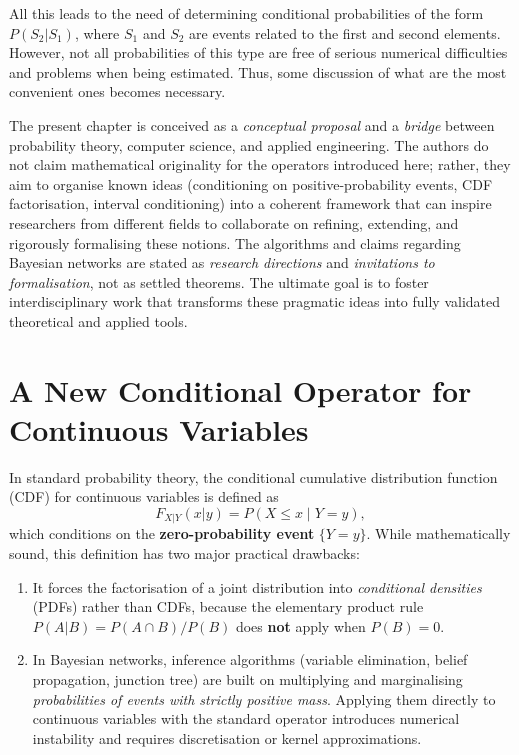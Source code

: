 All this leads to the need of determining conditional probabilities of the form $P(S_2|S_1)$, where $S_1$ and $S_2$ are events related to the first and second elements. However, not all probabilities of this type are free of serious numerical difficulties and problems when being estimated. Thus, some discussion of what are the most convenient ones becomes necessary.

\begin{remarkbox}
\begin{remarkT}
The present chapter is conceived as a \emph{conceptual proposal} and a \emph{bridge} between probability theory, computer science, and applied engineering. The authors do not claim mathematical originality for the operators introduced here; rather, they aim to organise known ideas (conditioning on positive-probability events, CDF factorisation, interval conditioning) into a coherent framework that can inspire researchers from different fields to collaborate on refining, extending, and rigorously formalising these notions. The algorithms and claims regarding Bayesian networks are stated as \emph{research directions} and \emph{invitations to formalisation}, not as settled theorems. The ultimate goal is to foster interdisciplinary work that transforms these pragmatic ideas into fully validated theoretical and applied tools.
\end{remarkT}
\end{remarkbox}

\section{A New Conditional Operator for Continuous Variables}
\label{sec:positive-probability-conditional}

In standard probability theory, the conditional cumulative distribution function (CDF) for continuous variables is defined as
\[
F_{X|Y}(x|y) = P(X \le x \mid Y = y),
\]
which conditions on the \textbf{zero-probability event} $\{Y=y\}$. While mathematically sound, this definition has two major practical drawbacks:
\begin{enumerate}
    \item It forces the factorisation of a joint distribution into \emph{conditional densities} (PDFs) rather than CDFs, because the elementary product rule $P(A|B)=P(A\cap B)/P(B)$ does \textbf{not} apply when $P(B)=0$.
    \item In Bayesian networks, inference algorithms (variable elimination, belief propagation, junction tree) are built on multiplying and marginalising \emph{probabilities of events with strictly positive mass}. Applying them directly to continuous variables with the standard operator introduces numerical instability and requires discretisation or kernel approximations.
\end{enumerate}

